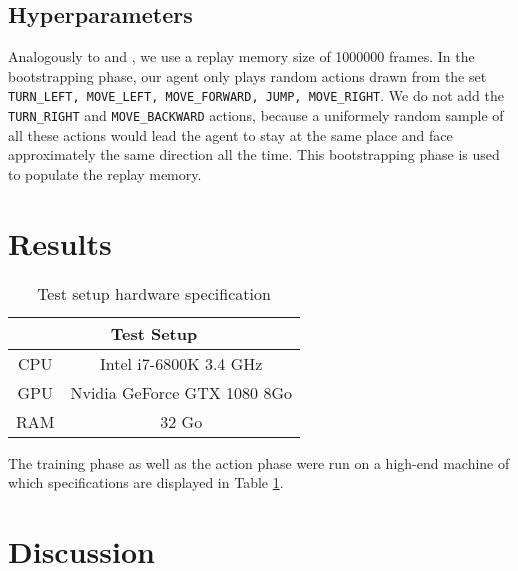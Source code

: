 \documentclass[letterpaper]{article}
\begin{document}
\subsection{Hyperparameters}
Analogously to \cite{Mnih2015} and \cite{Lample2016}, we use a replay memory size of 1000000 frames. In the bootstrapping phase, our agent only plays random actions drawn from the set \texttt{TURN\_LEFT, MOVE\_LEFT, MOVE\_FORWARD, JUMP, MOVE\_RIGHT}. We do not add the \texttt{TURN\_RIGHT} and \texttt{MOVE\_BACKWARD} actions, because a uniformely random sample of all these actions would lead the agent to stay at the same place and face approximately the same direction all the time. This bootstrapping phase is used to populate the replay memory.


\section{Results}
\begin{table}[h]
\centering
\begin{tabular}{cc}
\multicolumn{2}{c}{Test Setup}                         \\ \hline
\multicolumn{1}{c|}{CPU} & Intel i7-6800K 3.4 GHz      \\
\multicolumn{1}{c|}{GPU} & Nvidia GeForce GTX 1080 8Go \\
\multicolumn{1}{c|}{RAM} & 32 Go                      
\end{tabular}
\caption{Test setup hardware specification}
\label{tab:specs}
\end{table}

The training phase as well as the action phase were run on a high-end machine of which specifications are displayed in Table \ref{tab:specs}.

\section{Discussion}


\footnotesize


\end{document}
